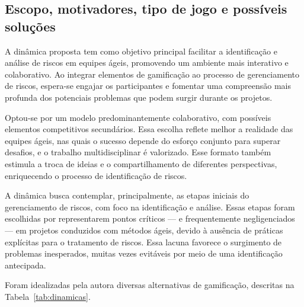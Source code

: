 \documentclass[
	12pt,
	openright,
	twoside,
	a4paper,
	english,
	brazil
	]{abntex2}
\begin{document}
\subsection{Escopo, motivadores, tipo de jogo e possíveis soluções}

A dinâmica proposta tem como objetivo principal facilitar a identificação e análise de riscos em equipes ágeis, promovendo um ambiente mais interativo e colaborativo. Ao integrar elementos de gamificação ao processo de gerenciamento de riscos, espera-se engajar os participantes e fomentar uma compreensão mais profunda dos potenciais problemas que podem surgir durante os projetos.

Optou-se por um modelo predominantemente colaborativo, com possíveis elementos competitivos secundários. Essa escolha reflete melhor a realidade das equipes ágeis, nas quais o sucesso depende do esforço conjunto para superar desafios, e o trabalho multidisciplinar é valorizado. Esse formato também estimula a troca de ideias e o compartilhamento de diferentes perspectivas, enriquecendo o processo de identificação de riscos.

A dinâmica busca contemplar, principalmente, as etapas iniciais do gerenciamento de riscos, com foco na identificação e análise. Essas etapas foram escolhidas por representarem pontos críticos — e frequentemente negligenciados — em projetos conduzidos com métodos ágeis, devido à ausência de práticas explícitas para o tratamento de riscos. Essa lacuna favorece o surgimento de problemas inesperados, muitas vezes evitáveis por meio de uma identificação antecipada.

Foram idealizadas pela autora diversas alternativas de gamificação, descritas na Tabela~\ref{tab:dinamicas}.
\end{document}

